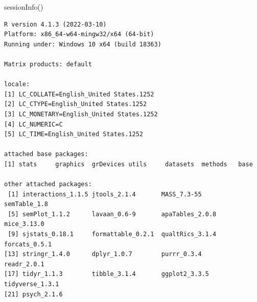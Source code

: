 \documentclass[
]{book}
\newenvironment{Shaded}{\begin{snugshade}}{\end{snugshade}}
\newcommand{\FunctionTok}[1]{\textcolor[rgb]{0.00,0.00,0.00}{#1}}
\newcommand{\NormalTok}[1]{#1}
\begin{document}
\begin{Shaded}
\begin{Highlighting}[]
\FunctionTok{sessionInfo}\NormalTok{()}
\end{Highlighting}
\end{Shaded}

\begin{verbatim}
R version 4.1.3 (2022-03-10)
Platform: x86_64-w64-mingw32/x64 (64-bit)
Running under: Windows 10 x64 (build 18363)

Matrix products: default

locale:
[1] LC_COLLATE=English_United States.1252 
[2] LC_CTYPE=English_United States.1252   
[3] LC_MONETARY=English_United States.1252
[4] LC_NUMERIC=C                          
[5] LC_TIME=English_United States.1252    

attached base packages:
[1] stats     graphics  grDevices utils     datasets  methods   base     

other attached packages:
 [1] interactions_1.1.5 jtools_2.1.4       MASS_7.3-55        semTable_1.8      
 [5] semPlot_1.1.2      lavaan_0.6-9       apaTables_2.0.8    mice_3.13.0       
 [9] sjstats_0.18.1     formattable_0.2.1  qualtRics_3.1.4    forcats_0.5.1     
[13] stringr_1.4.0      dplyr_1.0.7        purrr_0.3.4        readr_2.0.1       
[17] tidyr_1.1.3        tibble_3.1.4       ggplot2_3.3.5      tidyverse_1.3.1   
[21] psych_2.1.6       


\end{verbatim}
\end{document}

